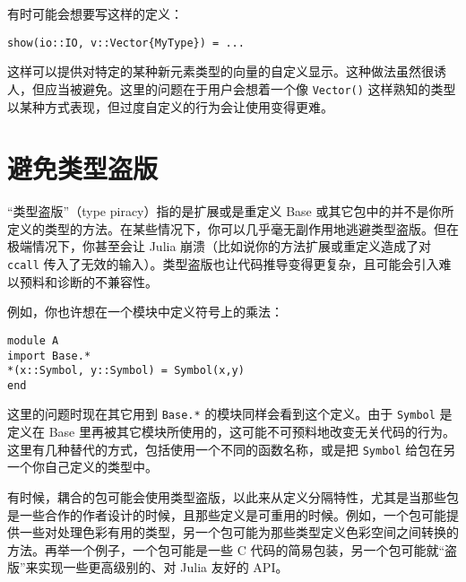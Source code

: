 有时可能会想要写这样的定义：




\begin{verbatim}
show(io::IO, v::Vector{MyType}) = ...
\end{verbatim}



这样可以提供对特定的某种新元素类型的向量的自定义显示。这种做法虽然很诱人，但应当被避免。这里的问题在于用户会想着一个像 \texttt{Vector()} 这样熟知的类型以某种方式表现，但过度自定义的行为会让使用变得更难。



\hypertarget{16979726342714314714}{}


\section{避免类型盗版}



“类型盗版”（type piracy）指的是扩展或是重定义 Base 或其它包中的并不是你所定义的类型的方法。在某些情况下，你可以几乎毫无副作用地逃避类型盗版。但在极端情况下，你甚至会让 Julia 崩溃（比如说你的方法扩展或重定义造成了对 \texttt{ccall} 传入了无效的输入）。类型盗版也让代码推导变得更复杂，且可能会引入难以预料和诊断的不兼容性。



例如，你也许想在一个模块中定义符号上的乘法：




\begin{verbatim}
module A
import Base.*
*(x::Symbol, y::Symbol) = Symbol(x,y)
end
\end{verbatim}



这里的问题时现在其它用到 \texttt{Base.*} 的模块同样会看到这个定义。由于 \texttt{Symbol} 是定义在 Base 里再被其它模块所使用的，这可能不可预料地改变无关代码的行为。这里有几种替代的方式，包括使用一个不同的函数名称，或是把 \texttt{Symbol} 给包在另一个你自己定义的类型中。



有时候，耦合的包可能会使用类型盗版，以此来从定义分隔特性，尤其是当那些包是一些合作的作者设计的时候，且那些定义是可重用的时候。例如，一个包可能提供一些对处理色彩有用的类型，另一个包可能为那些类型定义色彩空间之间转换的方法。再举一个例子，一个包可能是一些 C 代码的简易包装，另一个包可能就“盗版”来实现一些更高级别的、对 Julia 友好的 API。



\hypertarget{11741910651274288820}{}


